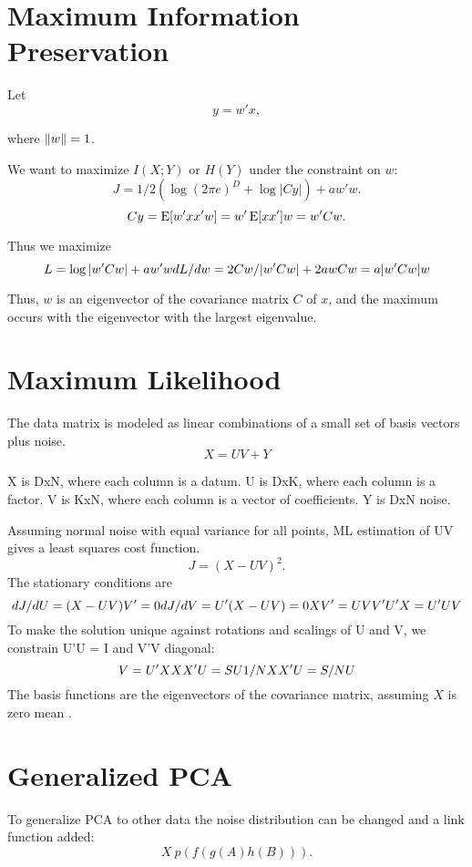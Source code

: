 \documentclass{article}
\begin{document}
\section{Maximum Information Preservation}

Let 
\begin{equation}
y = w'x,
\end{equation}

where $\lVert w \rVert = 1$.

We want to maximize $I(X;Y)$ or $H(Y)$ under the constraint on $w$:
\begin{equation}
J = 1/2(\log (2 \pi e)^D + \log |Cy|) + a w'w.
\end{equation}
\begin{equation}
Cy = \operatorname{E}[w'xx'w] = w'\operatorname{E}[xx']w = w'Cw.
\end{equation}

Thus we maximize
\begin{equation}
L = \log |w'Cw| + a w'w \\
dL/dw = 2Cw/|w'Cw| + 2aw \\
Cw = a|w'Cw|w
\end{equation}

Thus, $w$ is an eigenvector of the covariance matrix $C$ of $x$, and the maximum occurs with the eigenvector with the largest eigenvalue.

\section{Maximum Likelihood}

The data matrix is modeled as linear combinations of a small set of basis vectors plus noise.
\begin{equation}
X = UV + Y
\end{equation}

X is DxN, where each column is a datum.
U is DxK, where each column is a factor.
V is KxN, where each column is a vector of coefficients.
Y is DxN noise.

Assuming normal noise with equal variance for all points, ML estimation of UV gives a least squares cost function.
\begin{equation}
J = (X-UV)^2.
\end{equation}
The stationary conditions are
\begin{equation}
dJ/dU = (X-UV)V' = 0 \\
dJ/dV = U'(X-UV) = 0 \\
XV' = UVV' \\
U'X = U'UV
\end{equation}
To make the solution unique against rotations and scalings of U and V, we constrain U'U = I and V'V diagonal:
\begin{equation}
V = U'X \\
XX'U = SU \\
1/N XX'U = S/N U
\end{equation}
The basis functions are the eigenvectors of the covariance matrix, assuming $X$ is zero mean .

\section{Generalized PCA}

To generalize PCA to other data the noise distribution can be changed and a link function added:
\begin{equation}
X ~ p(f(g(A)h(B))).
\end{equation}
\end{document}
